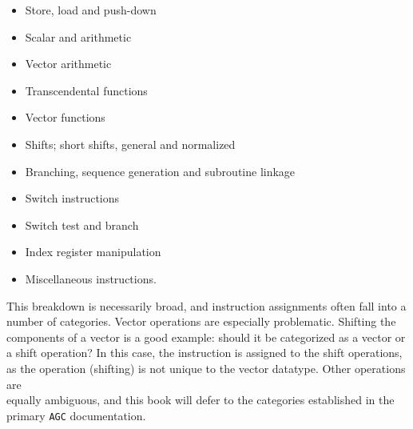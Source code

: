 \documentclass[refcap, oxford]{ahsan}
\begin{document}
\begin{itemize}
  \item Store, load and push-down
  \item Scalar and arithmetic
  \item Vector arithmetic
  \item Transcendental functions
  \item Vector functions
  \item Shifts; short shifts, general and normalized
  \item Branching, sequence generation and subroutine linkage
  \item Switch instructions
  \item Switch test and branch
  \item Index register manipulation
  \item Miscellaneous instructions.
\end{itemize}

This breakdown is necessarily broad, and instruction assignments often fall into a number of categories. Vector operations are especially problematic. Shifting the components of a vector is a good example: should it be categorized as a vector or a shift operation? In this case, the instruction is assigned to the shift operations, as the operation (shifting) is not unique to the vector datatype. Other operations are\\
equally ambiguous, and this book will defer to the categories established in the primary \texttt{AGC} documentation.
\end{document}
